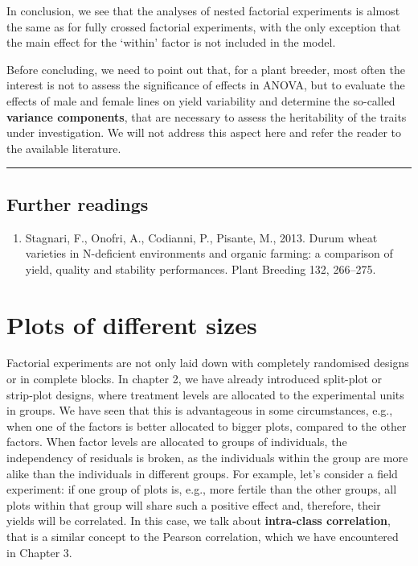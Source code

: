 \documentclass[a4paper,12pt,oneside]{book}
\providecommand{\tightlist}{%
  \setlength{\itemsep}{0pt}\setlength{\parskip}{0pt}}
\begin{document}
In conclusion, we see that the analyses of nested factorial experiments is almost the same as for fully crossed factorial experiments, with the only exception that the main effect for the `within' factor is not included in the model.

Before concluding, we need to point out that, for a plant breeder, most often the interest is not to assess the significance of effects in ANOVA, but to evaluate the effects of male and female lines on yield variability and determine the so-called \textbf{variance components}, that are necessary to assess the heritability of the traits under investigation. We will not address this aspect here and refer the reader to the available literature.

\begin{center}\rule{0.5\linewidth}{0.5pt}\end{center}

\hypertarget{further-readings-8}{%
\section{Further readings}\label{further-readings-8}}

\begin{enumerate}
\def\labelenumi{\arabic{enumi}.}
\tightlist
\item
  Stagnari, F., Onofri, A., Codianni, P., Pisante, M., 2013. Durum wheat varieties in N-deficient environments and organic farming: a comparison of yield, quality and stability performances. Plant Breeding 132, 266--275.
\end{enumerate}

\hypertarget{plots-of-different-sizes}{%
\chapter{Plots of different sizes}\label{plots-of-different-sizes}}

Factorial experiments are not only laid down with completely randomised designs or in complete blocks. In chapter 2, we have already introduced split-plot or strip-plot designs, where treatment levels are allocated to the experimental units in groups. We have seen that this is advantageous in some circumstances, e.g., when one of the factors is better allocated to bigger plots, compared to the other factors. When factor levels are allocated to groups of individuals, the independency of residuals is broken, as the individuals within the group are more alike than the individuals in different groups. For example, let's consider a field experiment: if one group of plots is, e.g., more fertile than the other groups, all plots within that group will share such a positive effect and, therefore, their yields will be correlated. In this case, we talk about \textbf{intra-class correlation}, that is a similar concept to the Pearson correlation, which we have encountered in Chapter 3.
\end{document}
